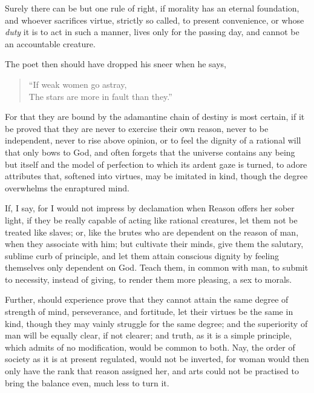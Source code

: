 Surely there can be but one rule of right, if morality has an eternal
foundation, and whoever sacrifices virtue, strictly so called, to
present convenience, or whose \textit{duty} it is to act in such a
manner, lives only for the passing day, and cannot be an accountable
creature.

The poet then should have dropped his sneer when he says,


\begin{verse}
``If weak women go astray,\\
The stars are more in fault than they.''
\end{verse}

\noindent For that they are bound by the adamantine chain of destiny
is most certain, if it be proved that they are never to exercise their
own reason, never to be independent, never to rise  above
opinion, or to feel the dignity of a rational will that only bows to
God, and often forgets that the universe contains any being but itself
and the model of perfection to which its ardent gaze is turned, to
adore attributes that, softened into virtues, may be imitated in kind,
though the degree overwhelms the enraptured mind.

If, I say, for I would not impress by declamation when Reason offers
her sober light, if they be really capable of acting like rational
creatures, let them not be treated like slaves; or, like the brutes
who are dependent on the reason of man, when they associate with him;
but cultivate their minds, give them the salutary, sublime curb of
principle, and let them attain conscious dignity by feeling themselves
only dependent on God. Teach them, in common with man, to submit to
necessity, instead of giving, to render them more pleasing, a sex to
morals.

Further, should experience prove that they cannot attain the same
degree of \llb strength of mind, perseverance, and fortitude, let
their virtues be the same in kind, though they may vainly struggle for
the same degree; and the superiority of man will be equally clear, if
not  clearer; and truth, as it is a simple principle, which
admits of no modification, would be common to both. Nay, the order of
society as it is at present regulated, would not be inverted, for
woman would then only have the rank that reason assigned her, and arts
could not be practised to bring the balance even, much less to turn
it.

